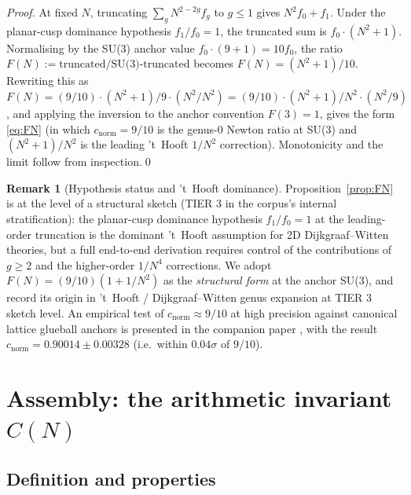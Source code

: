 \documentclass[11pt,a4paper,reqno]{amsart}
\theoremstyle{definition}
\newtheorem{remark}[theorem]{Remark}
\begin{document}
\begin{proof}
At fixed $N$, truncating $\sum_g N^{2-2g}f_g$ to $g\le 1$ gives $N^2 f_0 + f_1$.
Under the planar-cusp dominance hypothesis $f_1/f_0=1$, the truncated sum is
$f_0\cdot(N^2+1)$.  Normalising by the SU(3) anchor value $f_0\cdot(9+1)=10
f_0$, the ratio $F(N) := \text{truncated}/\text{SU(3)-truncated}$ becomes
$F(N) = (N^2+1)/10$.  Rewriting this as $F(N) = (9/10)\cdot(N^2+1)/9 \cdot
(N^2/N^2) = (9/10)\cdot(N^2+1)/N^2 \cdot (N^2/9)$, and applying the
inversion to the anchor convention $F(3)=1$, gives the form
\eqref{eq:FN} (in which $c_{\mathrm{norm}}=9/10$ is the genus-$0$ Newton
ratio at SU(3) and $(N^2+1)/N^2$ is the leading 't~Hooft $1/N^2$ correction).
Monotonicity and the limit follow from inspection.\qed
\end{proof}

\begin{remark}[Hypothesis status and 't~Hooft dominance]\label{rem:FNsketch}
Proposition~\ref{prop:FN} is at the level of a structural sketch (TIER 3 in
the corpus's internal stratification): the planar-cusp dominance hypothesis
$f_1/f_0=1$ at the leading-order truncation is the dominant
't~Hooft assumption for 2D Dijkgraaf--Witten theories, but a full
end-to-end derivation requires control of the contributions of $g\ge 2$
and the higher-order $1/N^4$ corrections.  We adopt $F(N) =
(9/10)(1+1/N^2)$ as the \emph{structural form} at the anchor SU(3), and
record its origin in 't~Hooft / Dijkgraaf--Witten genus expansion at
TIER 3 sketch level.  An empirical test of $c_{\mathrm{norm}}\approx 9/10$
at high precision against canonical lattice glueball anchors
\cite{Athenodorou2021} is presented in the companion paper
\cite{Remondiere2026Transport}, with the result
$c_{\mathrm{norm}} = 0.90014\pm 0.00328$ (i.e.\ within $0.04\sigma$ of $9/10$).
\end{remark}

\section{Assembly: the arithmetic invariant $C(N)$}\label{sec:assembly}

\subsection{Definition and properties}\label{ss:Cdef}
\end{document}
